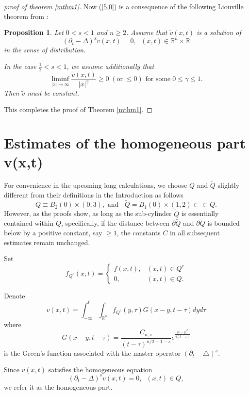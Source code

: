 \documentclass[12pt]{article}
\newtheorem{proposition}[definition]{Proposition}
\theoremstyle{remark}
\numberwithin{equation}{section}
\newcommand{\lap}{\mbox{$\triangle$}}
\begin{document}
\begin{proof}[proof of theorem \ref{mthm1}]
Now (\ref{5.0}) is a consequence of the following Liouville theorem from \cite{CGM}:
\begin{proposition}\label{Liouville}
Let $0<s<1$ and $n\geq2$.
Assume that $\tilde{v}(x,t)$ is a solution of
$$
(\partial_t-\Delta)^s \tilde{v}(x,t) =0, \; \,\,(x, t)\in \mathbb{R}^n\times \mathbb{R}
$$
in the sense of distribution.

In the case $\frac{1}{2}<s < 1$, we assume additionally that
\begin{equation}\label{AA}
  \liminf_{|x|\rightarrow\infty}\frac{\tilde{v}(x,t)}{|x|^\gamma}\geq 0 \; ( \mbox{or} \; \leq 0) \,\,\mbox{for some} \;0\leq\gamma\leq 1.
\end{equation}
Then $\tilde{v}$ must be constant.
\end{proposition}

This completes the proof of Theorem \ref{mthm1}. \end{proof}


\section{Estimates of the homogeneous part v(x,t)}

For convenience in the upcoming long calculations, we choose $Q$ and $\tilde{Q}$ slightly different from their definitions in the Introduction as follows
$$ Q \equiv B_2(0) \times (0,3), \mbox{ and } \; \; \tilde{Q} = B_1(0) \times (1,2) \subset \subset Q.$$
However, as the proofs show, as long as the sub-cylinder $\tilde{Q}$ is essentially contained within $Q$, specifically, if
the distance between $\partial \tilde{Q}$ and $\partial Q$ is bounded below by a positive constant, say $\geq 1$, the constants $C$ in all subsequent estimates remain unchanged.


Set
$$ f_{Q^c} (x,t) = \left\{ \begin{array}{ll} f(x,t), & (x,t) \in Q^c \\
0, & (x, t) \in Q.
\end{array}
\right.
$$

Denote
$$v(x,t) = \int_{-\infty}^t \int_{\mathbb{R}^n} f_{Q^c}(y,\tau) G(x-y, t-\tau) dy d\tau$$
where
$$G(x-y, t-\tau) = \frac{C_{n,s}}{(t-\tau)^{n/2+1-s}} e^{\frac{|x-y|^2}{4(t-\tau)}}$$
is the Green's function associated with the master operator $(\partial_t - \lap)^s$.

Since $v(x,t)$ satisfies the homogeneous equation
$$(\partial_t - \Delta)^s v(x,t) = 0, \;\; (x,t) \in Q,$$
we refer it as the homogeneous part.
\medskip
\end{document}
